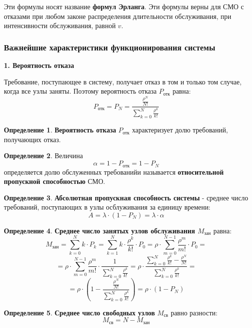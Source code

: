 \documentclass[aps,%
12pt,%
final,%
oneside,
onecolumn,%
musixtex, %
superscriptaddress,%
centertags]{article} %
\theoremstyle{plain}
\theoremstyle{definition}
\newtheorem{definition}{Определение}[subsection]
\theoremstyle{remark}
\begin{document}
Эти формулы носят название \textbf{формул Эрланга}. Эти формулы верны для СМО с отказами при любом законе распределения длительности обслуживания, при интенсивности обслуживания, равной $v$.

\subsubsection{Важнейшие характеристики функционирования системы}

\textbf{1. Вероятность отказа}

Требование, поступающее в систему, получает отказ в том и только том случае, когда все узлы заняты. Поэтому вероятность отказа $P_{\text{отк}}$ равна:
$$P_{\text{отк}} = P_N = \frac{\frac{\rho^N}{N!}}{\sum\limits_{k=0}^N \frac{\rho^k}{k!}}$$

\begin{definition}
	\textbf{Вероятность отказа} $P_{\text{отк}}$ характеризует долю требований, получающих отказ.
\end{definition}

\begin{definition}
	Величина
	$$\alpha = 1 - P_{\text{отк}} = 1 - P_N$$
	определяется долю обслуженных требованийи называется \textbf{относительной пропускной способностью} СМО.
\end{definition}

\begin{definition}
	\textbf{Абсолютная пропускная способность системы} - среднее число требований, поступающих в узлы осблуживания за единицу времени:
	$$A = \lambda \cdot (1-P_N) = \lambda \cdot \alpha$$
\end{definition}

\begin{definition}
	\textbf{Среднее число занятых узлов обслуживания $M_{\text{зан}}$} равна:
	$$M_{\text{зан}} = \sum\limits_{k=0}^N k \cdot P_k = \sum\limits_{k=1}^N k \cdot \frac{\rho^k}{k!} \cdot P_0 = \rho \cdot \sum\limits_{m=0}^{N-1} \frac{\rho^m}{m!} \cdot P_0 = $$
	$$ = \rho \cdot \sum\limits_{m=0}^{N-1} \frac{\rho^m}{m!}\cdot  \frac{1}{\sum\limits_{k=0}^N \frac{\rho^k}{k!}} = \rho\cdot \frac{\sum\limits_{k=0}^{N} \frac{\rho^k}{k!} - \frac{\rho^N}{N!}}{\sum\limits_{k=0}^N \frac{\rho^k}{k!}} = $$
	$$ = \rho \cdot \left(1- \frac{\frac{\rho^N}{N!}}{\sum\limits_{k=0}^N \frac{\rho^k}{k!}}\right) = \rho \cdot (1-P_N)$$
\end{definition}
\begin{definition}
	\textbf{Среднее число свободных узлов} $M_{\text{св}}$ равно разности:
	$$M_{\text{св}} = N - M_{\text{зан}}$$
\end{definition}
\end{document}
